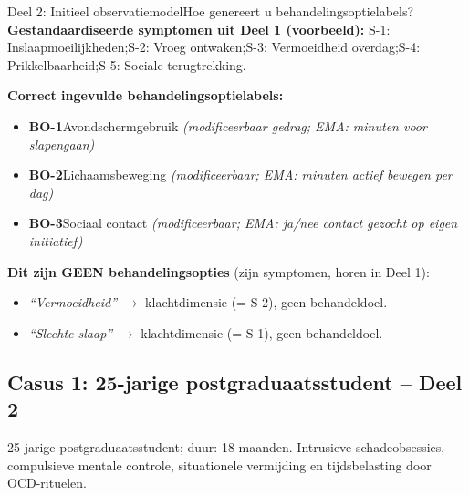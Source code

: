 \documentclass[11pt,a4paper]{article}
\begin{document}
\vspace{0.5em}
\nopagebreak[4]

\begin{voorbeeldbox}{Deel 2: Initieel observatiemodel}{Hoe genereert u behandelingsoptielabels?}
\small
\textbf{Gestandaardiseerde symptomen uit Deel 1 (voorbeeld):}
S-1: Inslaapmoeilijkheden;\enspace S-2: Vroeg ontwaken;\enspace S-3: Vermoeidheid overdag;\enspace S-4: Prikkelbaarheid;\enspace S-5: Sociale terugtrekking.

\medskip
\textbf{Correct ingevulde behandelingsoptielabels:}
\begin{itemize}[topsep=2pt,itemsep=1pt]
\item \textbf{BO-1}\enspace Avondschermgebruik
  \hfill\textit{(modificeerbaar gedrag; EMA: minuten voor slapengaan)}
\item \textbf{BO-2}\enspace Lichaamsbeweging
  \hfill\textit{(modificeerbaar; EMA: minuten actief bewegen per dag)}
\item \textbf{BO-3}\enspace Sociaal contact
  \hfill\textit{(modificeerbaar; EMA: ja/nee contact gezocht op eigen initiatief)}
\end{itemize}

\medskip
\textbf{\color{StrongRed}Dit zijn GEEN behandelingsopties} (zijn symptomen, horen in Deel 1):
\begin{itemize}[topsep=1pt,itemsep=0pt]
\item \textit{``Vermoeidheid''} $\rightarrow$ klachtdimensie (= S-2), geen behandeldoel.
\item \textit{``Slechte slaap''} $\rightarrow$ klachtdimensie (= S-1), geen behandeldoel.
\end{itemize}
\end{voorbeeldbox}

\vspace{0.5em}

\newpage
\subsection*{Casus 1: 25-jarige postgraduaatsstudent -- Deel 2}

\begin{complaintbox}[title={Casus 1: verkorte klachtomschrijving}]
\small 25-jarige postgraduaatsstudent; duur: 18 maanden. Intrusieve schadeobsessies, compulsieve mentale controle, situationele vermijding en tijdsbelasting door OCD-rituelen.
\end{complaintbox}
\end{document}
